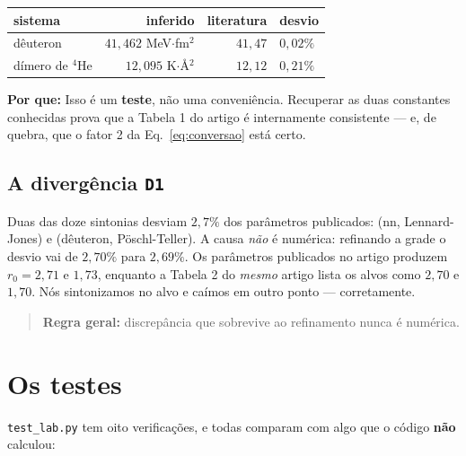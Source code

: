 \documentclass[11pt,a4paper]{article}
\newcommand{\pq}[1]{\medskip\noindent\textbf{Por que:} #1\medskip}
\begin{document}
\begin{center}
\begin{tabular}{lrrl}
\toprule
sistema & inferido & literatura & desvio \\
\midrule
dêuteron & $41{,}462$ MeV$\cdot$fm$^2$ & $41{,}47$ & $0{,}02\%$ \\
dímero de $^4$He & $12{,}095$ K$\cdot$\AA$^2$ & $12{,}12$ & $0{,}21\%$ \\
\bottomrule
\end{tabular}
\end{center}

\pq{Isso é um \textbf{teste}, não uma conveniência. Recuperar as duas constantes
conhecidas prova que a Tabela 1 do artigo é internamente consistente --- e, de
quebra, que o fator 2 da Eq.~\eqref{eq:conversao} está certo.}

\subsection*{A divergência \texttt{D1}}

Duas das doze sintonias desviam $2{,}7\%$ dos parâmetros publicados:
(nn, Lennard-Jones) e (dêuteron, Pöschl-Teller). A causa \emph{não} é numérica:
refinando a grade o desvio vai de $2{,}70\%$ para $2{,}69\%$. Os parâmetros
publicados no artigo produzem $r_0 = 2{,}71$ e $1{,}73$, enquanto a Tabela 2 do
\emph{mesmo} artigo lista os alvos como $2{,}70$ e $1{,}70$. Nós sintonizamos no
alvo e caímos em outro ponto --- corretamente.

\begin{quote}
\textbf{Regra geral:} discrepância que sobrevive ao refinamento nunca é numérica.
\end{quote}

\section{Os testes}

\texttt{test\_lab.py} tem oito verificações, e todas comparam com algo que o
código \textbf{não} calculou:
\end{document}

